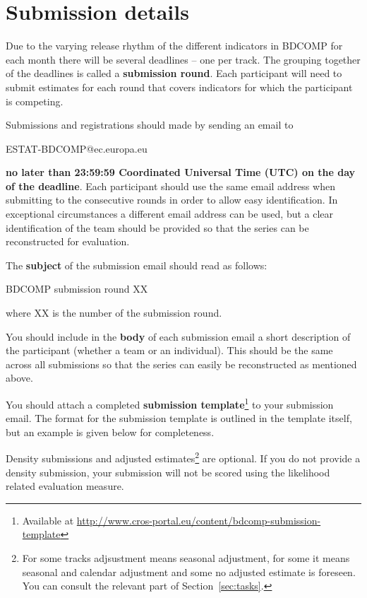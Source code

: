\documentclass[12pt]{article}
\begin{document}
\newpage
\section{Submission details}
\label{sec:details}

Due to the varying release rhythm of the different indicators in BDCOMP for each month there will be several deadlines – one per track. The grouping together of the deadlines is called a \textbf{submission round}. Each participant will need to submit estimates for each round that covers indicators for which the participant is competing.

Submissions and registrations should made by sending an email to 

ESTAT-BDCOMP@ec.europa.eu

\textbf{no later than 23:59:59 Coordinated Universal Time (UTC) on the day of the deadline}. Each participant should use the same email address when submitting to the consecutive rounds in order to allow easy identification. In exceptional circumstances a different email address can be used, but a clear identification of the team should be provided so that the series can be reconstructed for evaluation.

The \textbf{subject} of the submission email should read as follows:

BDCOMP submission round XX

where XX is the number of the submission round.

You should include in the \textbf{body} of each submission email a short description of the participant (whether a team or an individual). This should be the same across all submissions so that the series can easily be reconstructed as mentioned above.

You should attach a completed \textbf{submission template}\footnote{Available at \url{http://www.cros-portal.eu/content/bdcomp-submission-template}} to your submission email. The format for the submission template is outlined in the template itself, but an example is given below for completeness.

Density submissions and adjusted estimates\footnote{For some tracks adjsustment means seasonal adjustment, for some it means seasonal and calendar adjustment and some no adjusted estimate is foreseen. You can consult the relevant part of Section~\ref{sec:tasks}.} are optional. If you do not provide a density submission, your submission will not be scored using the likelihood related evaluation measure. 
\end{document}
